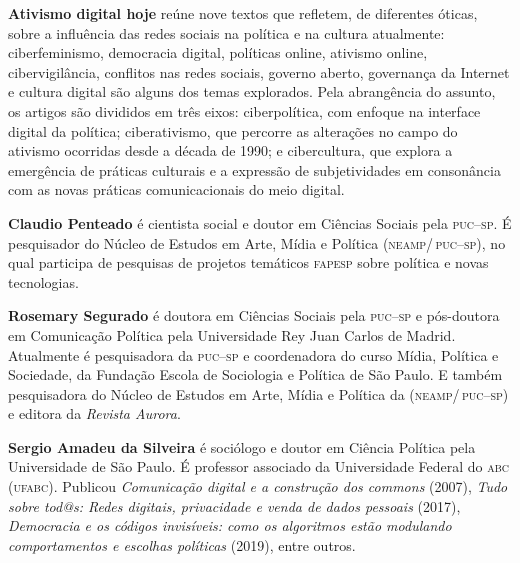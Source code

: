 \textbf{Ativismo digital hoje} reúne nove textos que refletem, de diferentes óticas, sobre a influência das redes sociais na política e na cultura atualmente: ciberfeminismo, democracia digital, políticas online, ativismo online, cibervigilância, conflitos nas redes sociais, governo aberto, governança da Internet e cultura digital são alguns dos temas explorados.
Pela abrangência do assunto, os artigos são divididos em três eixos: ciberpolítica, com enfoque na interface digital da política; ciberativismo, que percorre as alterações no campo do ativismo ocorridas desde a década de 1990; e cibercultura, que explora a emergência de práticas culturais e a expressão de subjetividades em consonância com as novas práticas comunicacionais do meio digital.

\textbf{Claudio Penteado} é cientista social e doutor em Ciências Sociais pela \textsc{puc--sp}. É pesquisador do Núcleo de Estudos em Arte, Mídia e Política (\textsc{neamp/\,puc--sp}), no qual participa de pesquisas de projetos temáticos \textsc{fapesp} sobre política e novas tecnologias.

\textbf{Rosemary Segurado} é doutora em Ciências Sociais pela \textsc{puc--sp} e pós-doutora em Comunicação Política pela Universidade Rey Juan Carlos de Madrid. Atualmente é pesquisadora da \textsc{puc--sp} e coordenadora do curso Mídia, Política e Sociedade, da Fundação Escola de Sociologia e Política de São Paulo. 
E também pesquisadora do Núcleo de Estudos em Arte, Mídia e Política da (\textsc{neamp/\,puc--sp}) e editora da \textit{Revista Aurora}.

\textbf{Sergio Amadeu da Silveira} é sociólogo e doutor em Ciência Política pela Universidade de São Paulo. É professor associado da Universidade Federal do \textsc{abc} (\textsc{ufabc}). Publicou \textit{Comunicação digital e a construção dos commons} (2007), \textit{Tudo sobre tod@s: Redes digitais, privacidade e venda de dados pessoais} (2017), \textit{Democracia e os códigos invisíveis: como os algoritmos estão modulando comportamentos e escolhas políticas} (2019), entre outros.


